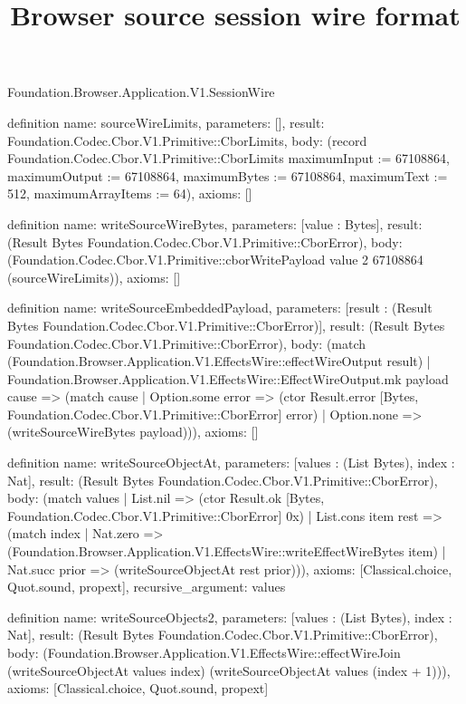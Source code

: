 \begin{lexlean}{Foundation.Browser.Application.V1.SessionWire}
\title{Browser source session wire format}
\begin{semanticmodule}
definition{
  name: sourceWireLimits,
  parameters: [],
  result: Foundation.Codec.Cbor.V1.Primitive::CborLimits,
  body: (record Foundation.Codec.Cbor.V1.Primitive::CborLimits {maximumInput := 67108864, maximumOutput := 67108864, maximumBytes := 67108864, maximumText := 512, maximumArrayItems := 64}),
  axioms: []
}

definition{
  name: writeSourceWireBytes,
  parameters: [value : Bytes],
  result: (Result Bytes Foundation.Codec.Cbor.V1.Primitive::CborError),
  body: (Foundation.Codec.Cbor.V1.Primitive::cborWritePayload value 2 67108864 (sourceWireLimits)),
  axioms: []
}

definition{
  name: writeSourceEmbeddedPayload,
  parameters: [result : (Result Bytes Foundation.Codec.Cbor.V1.Primitive::CborError)],
  result: (Result Bytes Foundation.Codec.Cbor.V1.Primitive::CborError),
  body: (match (Foundation.Browser.Application.V1.EffectsWire::effectWireOutput result)
    | Foundation.Browser.Application.V1.EffectsWire::EffectWireOutput.mk payload cause => (match cause
      | Option.some error => (ctor Result.error [Bytes, Foundation.Codec.Cbor.V1.Primitive::CborError] error)
      | Option.none => (writeSourceWireBytes payload))),
  axioms: []
}

definition{
  name: writeSourceObjectAt,
  parameters: [values : (List Bytes), index : Nat],
  result: (Result Bytes Foundation.Codec.Cbor.V1.Primitive::CborError),
  body: (match values
    | List.nil => (ctor Result.ok [Bytes, Foundation.Codec.Cbor.V1.Primitive::CborError] 0x)
    | List.cons item rest => (match index
      | Nat.zero => (Foundation.Browser.Application.V1.EffectsWire::writeEffectWireBytes item)
      | Nat.succ prior => (writeSourceObjectAt rest prior))),
  axioms: [Classical.choice, Quot.sound, propext],
  recursive_argument: values
}

definition{
  name: writeSourceObjects2,
  parameters: [values : (List Bytes), index : Nat],
  result: (Result Bytes Foundation.Codec.Cbor.V1.Primitive::CborError),
  body: (Foundation.Browser.Application.V1.EffectsWire::effectWireJoin (writeSourceObjectAt values index) (writeSourceObjectAt values (index + 1))),
  axioms: [Classical.choice, Quot.sound, propext]
}


\end{semanticmodule}
\end{lexlean}
